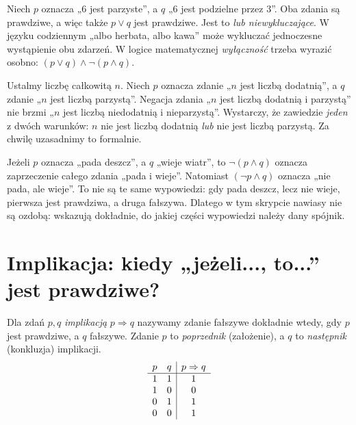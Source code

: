 \begin{przyklad}
Niech $p$ oznacza „$6$ jest parzyste”, a $q$ „$6$ jest
podzielne przez $3$”. Oba zdania są prawdziwe, a więc także
$p\lor q$ jest prawdziwe. Jest to \emph{lub niewykluczające}.
W języku codziennym „albo herbata, albo kawa” może wykluczać
jednoczesne wystąpienie obu zdarzeń. W logice matematycznej
\emph{wyłączność} trzeba wyrazić osobno: $(p\lor q)\land\neg(p\land q)$.
\end{przyklad}

\begin{przyklad}
Ustalmy liczbę całkowitą $n$. Niech $p$ oznacza zdanie „$n$ jest
liczbą dodatnią”, a $q$ zdanie „$n$ jest liczbą parzystą”. Negacja
zdania „$n$ jest liczbą dodatnią i parzystą” nie brzmi „$n$ jest
liczbą niedodatnią i nieparzystą”. Wystarczy, że zawiedzie
\emph{jeden} z dwóch warunków: $n$ nie jest liczbą dodatnią
\emph{lub} nie jest liczbą parzystą. Za chwilę uzasadnimy to formalnie.
\end{przyklad}


\begin{uwaga}
Jeżeli $p$ oznacza „pada deszcz”, a $q$ „wieje wiatr”, to
$\neg(p\land q)$ oznacza zaprzeczenie całego zdania „pada i wieje”.
Natomiast $(\neg p\land q)$ oznacza „nie pada, ale wieje”.
To nie są te same wypowiedzi: gdy pada deszcz, lecz nie wieje,
pierwsza jest prawdziwa, a druga fałszywa. Dlatego w tym skrypcie
nawiasy nie są ozdobą: wskazują dokładnie, do jakiej części
wypowiedzi należy dany spójnik.
\end{uwaga}

\section{Implikacja: kiedy „jeżeli..., to...” jest prawdziwe?}
\label{sec:implication}
\begin{definicja}\label{def:implication}
Dla zdań $p,q$ \emph{implikacją} $p\Rightarrow q$ nazywamy
zdanie fałszywe dokładnie wtedy, gdy $p$ jest prawdziwe, a $q$
fałszywe. Zdanie $p$ to \emph{poprzednik} (założenie), a $q$ to
\emph{następnik} (konkluzja) implikacji.
\[
\begin{array}{c c|c}
p&q&p\Rightarrow q\\\hline
1&1&1\\
1&0&0\\
0&1&1\\
0&0&1
\end{array}
\]
\end{definicja}

